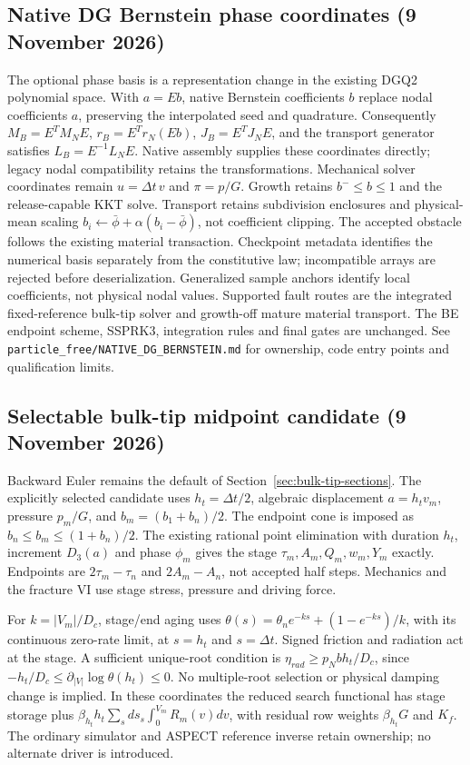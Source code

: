 \documentclass[11pt]{article}
\begin{document}
\subsection{Native DG Bernstein phase coordinates (9 November 2026)}
The optional phase basis is a representation change in the existing DGQ2
polynomial space. With $a=Eb$, native Bernstein coefficients $b$ replace nodal
coefficients $a$, preserving the interpolated seed and quadrature. Consequently
$M_B=E^TM_NE$, $r_B=E^Tr_N(Eb)$, $J_B=E^TJ_NE$, and the transport generator satisfies
$L_B=E^{-1}L_NE$. Native assembly supplies these coordinates directly; legacy
nodal compatibility retains the transformations. Mechanical solver coordinates
remain $u=\Delta t\,v$ and $\pi=p/G$.
Growth retains $b^-\leq b\leq1$ and the release-capable KKT solve. Transport
retains subdivision enclosures and physical-mean scaling
$b_i\leftarrow\bar\phi+\alpha(b_i-\bar\phi)$, not coefficient clipping.
The accepted obstacle follows the existing material transaction. Checkpoint
metadata identifies the numerical basis separately from the constitutive law;
incompatible arrays are rejected before deserialization. Generalized sample
anchors identify local coefficients, not physical nodal values. Supported fault
routes are the integrated fixed-reference bulk-tip solver and growth-off mature
material transport. The BE endpoint scheme, SSPRK3, integration rules and final
gates are unchanged. See \texttt{particle\_free/NATIVE\_DG\_BERNSTEIN.md} for
ownership, code entry points and qualification limits.


\subsection{Selectable bulk-tip midpoint candidate (9 November 2026)}
Backward Euler remains the default of Section~\ref{sec:bulk-tip-sections}.
The explicitly selected candidate uses $h_t=\Delta t/2$, algebraic displacement
$a=h_t v_m$, pressure $p_m/G$, and $b_m=(b_1+b_n)/2$. The endpoint cone is
imposed as $b_n\le b_m\le(1+b_n)/2$. The existing rational point elimination
with duration $h_t$, increment $D_3(a)$ and phase $\phi_m$ gives the stage
$\tau_m,A_m,Q_m,w_m,Y_m$ exactly. Endpoints are $2\tau_m-\tau_n$ and
$2A_m-A_n$, not accepted half steps. Mechanics and the fracture VI use stage
stress, pressure and driving force.

For $k=|V_m|/D_c$, stage/end aging uses
$\theta(s)=\theta_n e^{-ks}+(1-e^{-ks})/k$, with its continuous zero-rate limit,
at $s=h_t$ and $s=\Delta t$. Signed friction and radiation act at the stage.
A sufficient unique-root condition is $\eta_{rad}\ge p_N b h_t/D_c$, since
$-h_t/D_c\le\partial_{|V|}\log\theta(h_t)\le0$. No multiple-root selection or
physical damping change is implied. In these coordinates the reduced search
functional has stage storage plus $\beta_{h_t}h_t\sum_s ds_s\int_0^{V_m}R_m(v)dv$,
with residual row weights $\beta_{h_t}G$ and $K_f$. The ordinary simulator and
ASPECT reference inverse retain ownership; no alternate driver is introduced.
\end{document}
